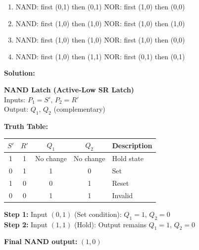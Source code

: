 \documentclass{article}
\begin{document}
\begin{enumerate}[label=(\Alph*)]
    \item \begin{tabbing}
        NAND: first (0,1) then (0,1) \quad \= NOR: first (1,0) then (0,0)
    \end{tabbing}
    
    \item \begin{tabbing}
        NAND: first (1,0) then (1,0) \quad \= NOR: first (1,0) then (1,0)
    \end{tabbing}
    
    \item \begin{tabbing}
        NAND: first (1,0) then (1,0) \quad \= NOR: first (1,0) then (0,0)
    \end{tabbing}
    
    \item \begin{tabbing}
        NAND: first (1,0) then (1,1) \quad \= NOR: first (0,1) then (0,1)
    \end{tabbing}
\end{enumerate}

\vspace{1em}

\noindent\textbf{Solution:}

\textbf{NAND Latch (Active-Low SR Latch)}\\
Inputs: $P_1 = S'$, $P_2 = R'$\\
Output: $Q_1$, $Q_2$ (complementary)

\textbf{Truth Table:}
\begin{center}
\begin{tabular}{|c|c|c|c|l|}
\hline
$S'$ & $R'$ & $Q_1$ & $Q_2$ & Description \\
\hline
1 & 1 & No change & No change & Hold state \\
0 & 1 & 1 & 0 & Set \\
1 & 0 & 0 & 1 & Reset \\
0 & 0 & 1 & 1 & Invalid \\
\hline
\end{tabular}
\end{center}
\textbf{Step 1:} Input $(0, 1)$ (Set condition): $Q_1 = 1$, $Q_2 = 0$\\
\textbf{Step 2:} Input $(1, 1)$ (Hold): Output remains $Q_1 = 1$, $Q_2 = 0$

\vspace{0.5em}
\noindent\textbf{Final NAND output:} $(1, 0)$
\end{document}
